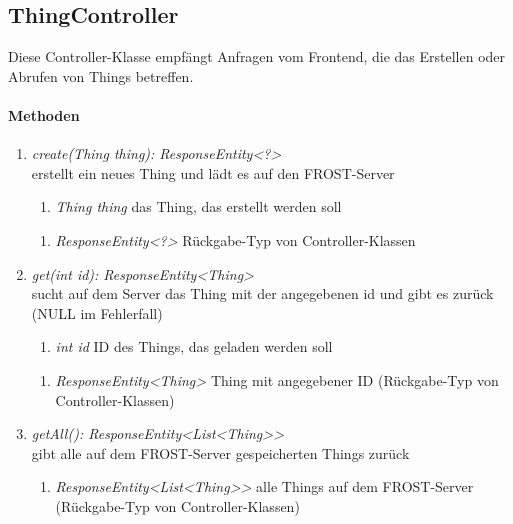 \subsection*{ThingController}\label{thingCon}
Diese Controller-Klasse empfängt Anfragen vom Frontend, die das Erstellen oder Abrufen von Things betreffen.

\paragraph{Methoden}

\begin{enumerate}[+]
	\item \textit{ create(Thing thing): ResponseEntity<?> }\\
	erstellt ein neues Thing und lädt es auf den FROST-Server
	
	\begin{enumerate}[$\bullet$]
		\item \textit{Thing thing} das Thing, das erstellt werden soll
		
	\end{enumerate}
	\vspace{-0.2cm}
	\begin{enumerate}[$\circ$]
		\item \textit{ResponseEntity<?>} Rückgabe-Typ von Controller-Klassen
	\end{enumerate}
	
	\item \textit{ get(int id): ResponseEntity<Thing> }\\
	sucht auf dem Server das Thing mit der angegebenen id und gibt es zurück (NULL im Fehlerfall)
	
	\begin{enumerate}[$\bullet$]
		\item \textit{int id} ID des Things, das geladen werden soll
		
	\end{enumerate}
	\vspace{-0.2cm}
	\begin{enumerate}[$\circ$]
		\item \textit{ResponseEntity<Thing>} Thing mit angegebener ID (Rückgabe-Typ von Controller-Klassen)
	\end{enumerate}
	\item \textit{ getAll(): ResponseEntity<List<Thing>> }\\
	gibt alle auf dem FROST-Server gespeicherten Things zurück
	
	\begin{enumerate}[$\circ$]
		\item \textit{ResponseEntity<List<Thing>>} alle Things auf dem FROST-Server (Rückgabe-Typ von Controller-Klassen)
	\end{enumerate}
	
	
\end{enumerate}